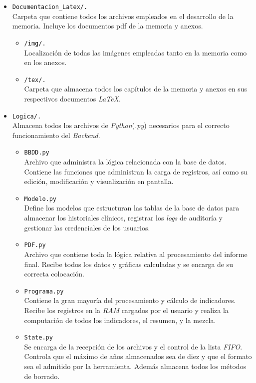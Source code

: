 \begin{itemize}
	\item \texttt{Documentacion\_Latex/.}\\Carpeta que contiene todos los archivos empleados en el desarrollo de
la memoria. Incluye los documentos pdf de la memoria y anexos.
		\begin{itemize}
			\item \texttt{/img/.}\\Localización de todas las imágenes empleadas tanto en la memoria como en los anexos.
			\item \texttt{/tex/.}\\Carpeta que almacena todos los capítulos de la memoria y anexos en sus respectivos documentos \textit{LaTeX}.
		\end{itemize}
		
	\item \texttt{Logica/.}\\Almacena todos los archivos de \textit{Python}(\textit{.py}) necesarios para el correcto funcionamiento del \textit{Backend}.
		\begin{itemize}
			\item \texttt{BBDD.py}\\Archivo que administra la lógica relacionada con la base de datos. Contiene las funciones que administran la carga de registros, así como su edición, modificación y visualización en pantalla.
			
			\item \texttt{Modelo.py}\\Define los modelos que estructuran las tablas de la base de datos para almacenar los historiales clínicos, registrar los \textit{logs} de auditoría y gestionar las credenciales de los usuarios.
			
			\item \texttt{PDF.py}\\Archivo que contiene toda la lógica relativa al procesamiento del informe final. Recibe todos los datos y gráficas calculadas y se encarga de su correcta colocación.
			
			\item \texttt{Programa.py}\\Contiene la gran mayoría del procesamiento y cálculo de indicadores. Recibe los registros en la \textit{RAM} cargados por el usuario y realiza la computación de todos los indicadores, el resumen, y la mezcla.
			
			\item \texttt{State.py}\\Se encarga de la recepción de los archivos y el control de la lista \textit{FIFO}. Controla que el máximo de años almacenados sea de diez y que el formato sea el admitido por la herramienta. Además almacena todos los métodos de borrado.
			

\end{itemize}
\end{itemize}
